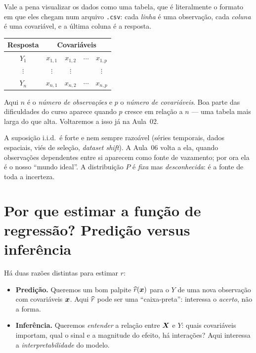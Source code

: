 \documentclass[11pt,a4paper]{article}
\begin{document}
\noindent
Vale a pena visualizar os dados como uma tabela, que é literalmente o formato em que
eles chegam num arquivo \texttt{.csv}: cada \emph{linha} é uma observação, cada
\emph{coluna} é uma covariável, e a última coluna é a resposta.
\begin{center}\small
\renewcommand{\arraystretch}{1.25}
\begin{tabular}{@{}c c c c c@{}}
\toprule
\textbf{Resposta} & \multicolumn{4}{c}{\textbf{Covariáveis}} \\
\midrule
$Y_1$    & $x_{1,1}$ & $x_{1,2}$ & $\cdots$ & $x_{1,p}$ \\
$\vdots$ & $\vdots$  & $\vdots$  &          & $\vdots$  \\
$Y_n$    & $x_{n,1}$ & $x_{n,2}$ & $\cdots$ & $x_{n,p}$ \\
\bottomrule
\end{tabular}
\end{center}
Aqui $n$ é o \emph{número de observações} e $p$ o \emph{número de covariáveis}.
Boa parte das dificuldades do curso aparece quando $p$ cresce em relação a $n$ ---
uma tabela mais larga do que alta. Voltaremos a isso já na Aula~02.

\begin{atencao}
A suposição i.i.d.\ é forte e nem sempre razoável (séries temporais, dados
espaciais, viés de seleção, \emph{dataset shift}). A Aula~06 volta a ela, quando
observações dependentes entre si aparecem como fonte de vazamento; por ora ela é o
nosso ``mundo ideal''. A distribuição $P$ é \emph{fixa} mas
\emph{desconhecida}: é a fonte de toda a incerteza.
\end{atencao}

\section{Por que estimar a função de regressão? Predição versus inferência}
Há duas razões distintas para estimar $r$:
\begin{itemize}[leftmargin=1.4cm]
  \item \textbf{Predição.} Queremos um bom palpite $\widehat{r}(\bm{x})$ para o $Y$ de uma
        nova observação com covariáveis $\bm{x}$. Aqui $\widehat{r}$ pode ser uma
        ``caixa-preta'': interessa o \emph{acerto}, não a forma.
  \item \textbf{Inferência.} Queremos \emph{entender} a relação entre $\bm{X}$ e $Y$:
        quais covariáveis importam, qual o sinal e a magnitude do efeito, há
        interações? Aqui interessa a \emph{interpretabilidade} do modelo.
\end{itemize}
\end{document}
